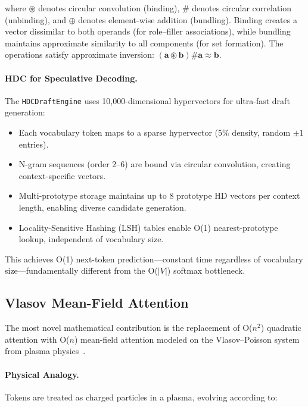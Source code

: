 \documentclass[11pt,a4paper,twocolumn]{article}
\begin{document}
where $\circledast$ denotes circular convolution (binding), $\#$ denotes circular correlation (unbinding), and $\oplus$ denotes element-wise addition (bundling). Binding creates a vector dissimilar to both operands (for role--filler associations), while bundling maintains approximate similarity to all components (for set formation). The operations satisfy approximate inversion: $(\mathbf{a} \circledast \mathbf{b}) \# \mathbf{a} \approx \mathbf{b}$.

\paragraph{HDC for Speculative Decoding.}
The \texttt{HDCDraftEngine} uses 10,000-dimensional hypervectors for ultra-fast draft generation:
\begin{itemize}
	\item Each vocabulary token maps to a sparse hypervector (5\% density, random $\pm 1$ entries).
	\item N-gram sequences (order 2--6) are bound via circular convolution, creating context-specific vectors.
	\item Multi-prototype storage maintains up to 8 prototype HD vectors per context length, enabling diverse candidate generation.
	\item Locality-Sensitive Hashing (LSH) tables enable O(1) nearest-prototype lookup, independent of vocabulary size.
\end{itemize}
This achieves O(1) next-token prediction---constant time regardless of vocabulary size---fundamentally different from the O($|V|$) softmax bottleneck.

\subsection{Vlasov Mean-Field Attention}
\label{sec:vlasov}

The most novel mathematical contribution is the replacement of O($n^2$) quadratic attention with O($n$) mean-field attention modeled on the Vlasov--Poisson system from plasma physics~\cite{vlasov1968vlasov}.

\paragraph{Physical Analogy.}
Tokens are treated as charged particles in a plasma, evolving according to:
\end{document}
